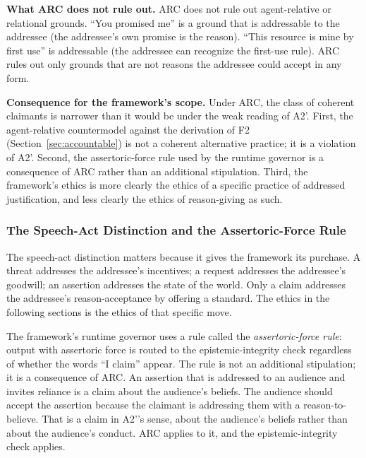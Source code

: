 \documentclass[11pt]{article}
\def\ensuremath#1{#1}%
\def\mathrm#1{#1}%
\newcommand{\Atwo}{\texorpdfstring{\ensuremath{\mathrm{A2}'}}{A2'}}
\begin{document}
\textbf{What ARC does not rule out.} ARC does not rule out agent-relative or relational grounds. ``You promised me'' is a ground that is addressable to the addressee (the addressee's own promise is the reason). ``This resource is mine by first use'' is addressable (the addressee can recognize the first-use rule). ARC rules out only grounds that are not reasons the addressee could accept in any form.

\textbf{Consequence for the framework's scope.} Under ARC, the class of coherent claimants is narrower than it would be under the weak reading of \Atwo{}. First, the agent-relative countermodel against the derivation of F2 (Section~\ref{sec:accountable}) is not a coherent alternative practice; it is a violation of \Atwo{}. Second, the assertoric-force rule used by the runtime governor is a consequence of ARC rather than an additional stipulation. Third, the framework's ethics is more clearly the ethics of a specific practice of addressed justification, and less clearly the ethics of reason-giving as such.

\subsubsection{The Speech-Act Distinction and the Assertoric-Force Rule}
The speech-act distinction matters because it gives the framework its purchase. A threat addresses the addressee's incentives; a request addresses the addressee's goodwill; an assertion addresses the state of the world. Only a claim addresses the addressee's reason-acceptance by offering a standard. The ethics in the following sections is the ethics of that specific move.

The framework's runtime governor uses a rule called the \emph{assertoric-force rule}: output with assertoric force is routed to the epistemic-integrity check regardless of whether the words ``I claim'' appear. The rule is not an additional stipulation; it is a consequence of ARC. An assertion that is addressed to an audience and invites reliance is a claim about the audience's beliefs. The audience should accept the assertion because the claimant is addressing them with a reason-to-believe. That is a claim in \Atwo{}'s sense, about the audience's beliefs rather than about the audience's conduct. ARC applies to it, and the epistemic-integrity check applies.
\end{document}
